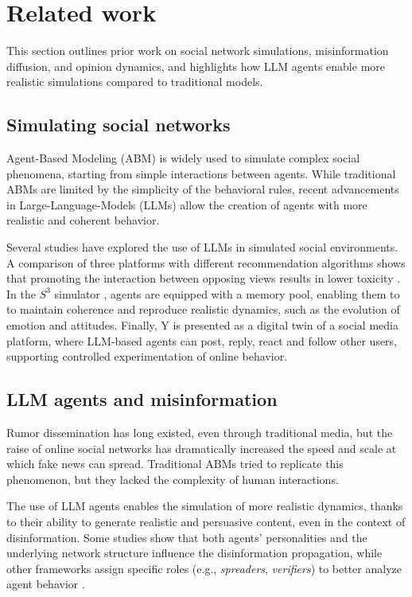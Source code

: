 \section{Related work}
\label{sec:relatedwork}

This section outlines prior work on social network simulations, misinformation diffusion, and opinion dynamics, and highlights how LLM agents enable more realistic simulations compared to traditional models.

\subsection{Simulating social networks}
Agent-Based Modeling (ABM) is widely used to simulate complex social phenomena, starting from simple interactions between agents.
While traditional ABMs are limited by the simplicity of the behavioral rules, recent advancements in Large-Language-Models (LLMs) allow the creation of agents with more realistic and coherent behavior.

Several studies have explored the use of LLMs in simulated social environments.
A comparison of three platforms with different recommendation algorithms  shows that promoting the interaction between opposing views results in lower toxicity \cite{törnberg2023evaluate}.
In the $S^3$ simulator \cite{gao2023s3socialnetworksimulationlarge}, agents are equipped with a memory pool, enabling them to to maintain coherence and reproduce realistic dynamics, such as the evolution of emotion and attitudes.
Finally, Y \cite{rossetti2024ysocialllmpoweredsocial} is presented as a digital twin of a social media platform, where LLM-based agents can post, reply, react and follow other users, supporting controlled experimentation of online behavior.



\subsection{LLM agents and misinformation}
Rumor dissemination has long existed, even through traditional media, but the raise of online social networks has dramatically increased the speed and scale at which fake news can spread.
Traditional ABMs tried to replicate this phenomenon, but they lacked the complexity of human interactions.

The use of LLM agents enables the simulation of more realistic dynamics, thanks to their ability to generate realistic and persuasive content, even in the context of disinformation.
Some studies show that both agents' personalities and the underlying network structure influence the disinformation propagation, while other frameworks assign specific roles (e.g., \textit{spreaders}, \textit{verifiers}) to better analyze agent behavior \cite{liu2024tinyslipgiantleap}.




